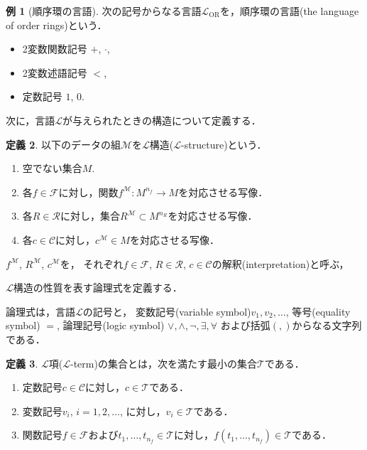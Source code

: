 \documentclass[uplatex, dvipdfmx]{jsarticle}
\numberwithin{equation}{section}
\newcommand{\map}[3]{{#1}\colon{#2}\rightarrow{#3}}
\theoremstyle{definition}
\newtheorem{definition}{定義}[section]
\newtheorem{example}[definition]{例}
\begin{document}
\begin{example}[順序環の言語]
     次の記号からなる言語$\mathcal{L}_\mathrm{OR}$を，順序環の言語(the language of order rings)という．
     \begin{itemize}
          \item 2変数関数記号 $+$, $\cdot$,
          \item 2変数述語記号 $<$,
          \item 定数記号 $1$, $0$.
     \end{itemize}
\end{example}

次に，言語$\mathcal{L}$が与えられたときの構造について定義する．

\begin{definition}
     以下のデータの組$\mathcal{M}$を$\mathcal{L}$構造($\mathcal{L}$-structure)という．
     \begin{enumerate}
          \item 空でない集合$M$. 
          \item 各$f \in \mathcal{F}$に対し，関数$\map{f^\mathcal{M}}{M^{n_f}}{M}$を対応させる写像．
          \item 各$R \in \mathcal{R}$に対し，集合$R^\mathcal{M} \subset M^{n_R}$を対応させる写像．
          \item 各$c \in \mathcal{C}$に対し，$c^\mathcal{M} \in M$を対応させる写像．
     \end{enumerate}
\end{definition}

$f^\mathcal{M}$, $R^\mathcal{M}$, $c^\mathcal{M}$を，
それぞれ$f \in \mathcal{F}$, $R \in \mathcal{R}$, $c \in \mathcal{C}$の解釈(interpretation)と呼ぶ，

$\mathcal{L}$構造の性質を表す論理式を定義する．

論理式は，言語$\mathcal{L}$の記号と，
変数記号(variable symbol)$v_1, v_2, \dots$, 
等号(equality symbol) $=$,
論理記号(logic symbol) $\lor, \land, \lnot, \exists, \forall$
および括弧$(, )$からなる文字列である．

\begin{definition}
     $\mathcal{L}$項($\mathcal{L}$-term)の集合とは，次を満たす最小の集合$\mathcal{T}$である．
     \begin{enumerate}
          \item 定数記号$c \in \mathcal{C}$に対し，$c \in \mathcal{T}$である．
          \item 変数記号$v_i$, $i=1, 2, \dots$, に対し，$v_i \in \mathcal{T}$である．
          \item 関数記号$f \in \mathcal{F}$および$t_1, \dots, t_{n_f} \in \mathcal{T}$に対し，$f(t_1, \dots, t_{n_f}) \in \mathcal{T}$である．
     \end{enumerate}
\end{definition}
\end{document}
